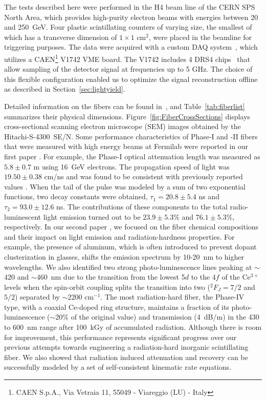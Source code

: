 \documentclass[a4paper,11pt]{article}
\begin{document}
The tests described here were performed in the H4 beam line of the CERN SPS North Area, which provides high-purity electron beams with energies between 20 and 250~GeV.  Four plastic scintillating counters of varying size, the smallest of which has a transverse dimension of $1 \times 1$ cm$^2$, were placed in the beamline for triggering purposes.  The data were acquired with a custom DAQ system~\cite{r-MAR}, which utilizes a CAEN\footnote{CAEN S.p.A., Via Vetraia 11, 55049 - Viareggio (LU) - Italy} V1742 VME board. The V1742 includes 4 DRS4 chips~\cite{r-DRS4} that allow sampling of the detector signal at frequencies up to 5 GHz. The choice of this flexible configuration enabled us to optimize the signal reconstruction offline as described in Section~\ref{sec:lightyield}.

Detailed information on the fibers can be found in~\cite{JINSTPaper}, and Table~\ref{tab:fiberlist} summarizes their physical dimensions.  Figure~\ref{fig:FiberCrossSections} displays cross-sectional scanning electron microscope (SEM) images obtained by the Hitachi-S-4300~SE/N.  Some performance characteristics of Phase-I and -II fibers that were measured with high energy beams at Fermilab were reported in our first paper \cite{JINSTPaper}.  For example, the Phase-I optical attenuation length was measured as $5.8\pm0.7$ m using 16~GeV  electrons.  The propagation speed of light was $19.50\pm0.38$ cm/ns and was found to be consistent with previously reported values \cite{Goro,Akch97}.  When the tail of the pulse was modeled by a sum of two exponential functions, two decay constants were obtained, $\tau_1= 20.8\pm5.4$ ns and $\tau_2= 93.0\pm12.6$ ns.  The contributions of these components to the total radio-luminescent light emission turned out to be $23.9\pm5.3$\% and $76.1\pm5.3$\%, respectively.  In our second paper \cite{JINSTPaper2}, we focused on the fiber chemical compositions and their impact on light emission and radiation-hardness properties.  For example, the presence of aluminum, which is often introduced to prevent dopant clusterization in glasses, shifts the emission spectrum by 10-20~nm to higher wavelengths.  We also identified two strong photo-luminescence lines peaking at $\sim$420 and $\sim$460~nm due to the transition from the lowest 5$d$ to the 4$f$ of the Ce$^{3+}$ levels when the spin-orbit coupling splits the transition into two ($^2F_{J}=7/2$ and $5/2$) separated by $\sim$2200 cm$^{-1}$. The most radiation-hard fiber, the Phase-IV type, with a coaxial Ce-doped ring structure, maintains a fraction of its photo-luminescence ($\sim$20\% of the original value) and transmission (4~dB/m) in the 430 to 600~nm range after 100~kGy of accumulated radiation. Although there is room for improvement, this performance represents significant progress over our previous attempts towards engineering a radiation-hard inorganic scintillating  fiber.  We also showed that radiation induced attenuation and recovery can be successfully modeled by a set of self-consistent kinematic rate equations.
\end{document}
